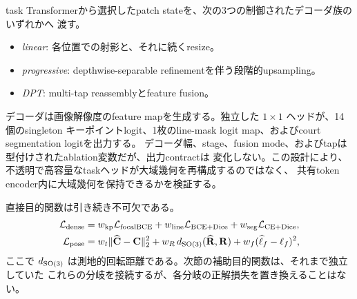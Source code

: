 task Transformerから選択したpatch stateを、次の3つの制御されたデコーダ族のいずれかへ
渡す。
\begin{itemize}
  \item \emph{linear}: 各位置での射影と、それに続くresize。
  \item \emph{progressive}: depthwise-separable refinementを伴う段階的upsampling。
  \item \emph{DPT}: multi-tap reassemblyとfeature fusion。
\end{itemize}
デコーダは画像解像度のfeature mapを生成する。独立した \(1\times1\) ヘッドが、14個のsingleton
キーポイントlogit、1枚のline-mask logit map、およびcourt segmentation logitを出力する。
デコーダ幅、stage、fusion mode、およびtapは型付けされたablation変数だが、出力contractは
変化しない。この設計により、不透明で高容量なtaskヘッドが大域幾何を再構成するのではなく、
共有token encoder内に大域幾何を保持できるかを検証する。

直接目的関数は引き続き不可欠である。
\begin{align}
  \mathcal{L}_{\mathrm{dense}}
   &=w_{\mathrm{kp}}\mathcal{L}_{\mathrm{focalBCE}}
    +w_{\mathrm{line}}\mathcal{L}_{\mathrm{BCE+Dice}}
    +w_{\mathrm{seg}}\mathcal{L}_{\mathrm{CE+Dice}}, \\
  \mathcal{L}_{\mathrm{pose}}
   &=w_t\|\widehat{\mathbf{C}}-\mathbf{C}\|_2^2
    +w_R\,d_{\mathrm{SO}(3)}(\widehat{\mathbf{R}},\mathbf{R})
    +w_f(\widehat\ell_f-\ell_f)^2,
  \label{eq:direct_losses}
\end{align}
ここで \(d_{\mathrm{SO}(3)}\) は測地的回転距離である。次節の補助目的関数は、それまで独立していた
これらの分岐を接続するが、各分岐の正解損失を置き換えることはない。
